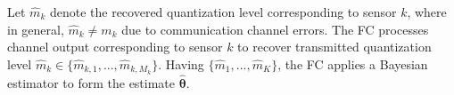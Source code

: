 \documentclass[conference]{IEEEtran}
\begin{document}
Let $\hat{m}_{k}$ denote the recovered quantization level corresponding to sensor $k$, where in general, $\hat{m}_{k}\neq m_{k}$ due to communication channel errors. The FC processes channel output corresponding to sensor $k$ to recover transmitted quantization level $\hat{m}_k \in \{\hat{m}_{k,1},...,\hat{m}_{k,M_k}\}$. Having $\{\hat{m}_1,...,\hat{m}_K\}$, the FC applies a Bayesian estimator to form the estimate $\hat{\boldsymbol{\theta}}$. 
%
%
\begin{comment}
Under certain regularity conditions that are satidfied by Gaussian vectors, the $q\times q$ FIM, denoted as $\boldsymbol{J}$, is defined as \cite{Van_Trees_estimation_book,Vosoughi2006sp2,Vosoughi2006sp1}:
%
%
%
\begin{equation} \label{FIM_Van_Trees}
\boldsymbol{J}\!=\!\mathbb{E}\!\left\{\!\!\left(\!\frac{\partial \ln p(\hat{m}_1,...,\hat{m}_K,\boldsymbol{\theta})}{\partial \boldsymbol{\theta}}\!\right)\!\!\left(\!\frac{\partial \ln p(\hat{m}_1,...,\hat{m}_K,\boldsymbol{\theta})}{\partial \boldsymbol{\theta}}\!\right)^T\!\right\},
\end{equation}
%
where the expectation is taken over $p(\hat{m}_1,...,\hat{m}_K,\boldsymbol{\theta})$.  
We refer the interested readers to section IV of \cite{Shirazi_Vosoughi_journal_2017} for the derivation of matrix $\boldsymbol{J}$. Our goal is to study sensor selection and transmit power allocation that maximizes tr($\boldsymbol{J}$) \cite{Varshney_sensor_selection_tsp2016}, subject to network transmit power constraint. In other words, we are interested in solving the following constrained optimization problem:
%
\begin{align*} \tag{P1}\label{power aloc sen selection problem}
\mathop{\text{maximize}}_{P_k, w_k, \forall k}\ \ \ \ &\sum_{k=1}^{K}w_kt_k(P_k)\nonumber\\
\text{s.t.}\ \ \ \ &\sum_{k=1}^{K}P_k\leq P_{tot},\ P_k\in \mathbb{R}^{+},\ \forall k\nonumber\\
&w_k\in \{0,1\},\ \forall k
\end{align*}
%
\end{comment}  
\end{document}
